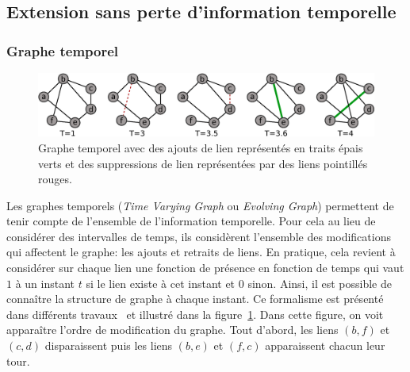 
\subsection{Extension sans perte d'information temporelle}
\label{subsec:pasperte_info}
\subsubsection{Graphe temporel}
\begin{figure}[h]
\centering
\includegraphics[width=0.9\linewidth]{img/Intro/evolvingGraph.eps}
\caption{Graphe temporel avec des ajouts de lien représentés en traits épais verts et des suppressions de lien représentées par des liens pointillés rouges.
}
\label{fig:exemple_evolving}
\end{figure}
Les graphes temporels (\emph{Time Varying Graph} ou \emph{Evolving Graph})
permettent de tenir compte de l'ensemble de l'information temporelle.
Pour cela au lieu de considérer des intervalles de temps, ils considèrent l'ensemble des modifications qui affectent le graphe: les ajouts et retraits de liens.
En pratique, cela revient à considérer sur chaque lien une fonction de présence en fonction de temps qui vaut $1$ à un instant $t$ si le lien existe à cet instant et $0$ sinon.
Ainsi, il est possible de connaître la structure de graphe à chaque instant.
Ce formalisme est présenté dans différents travaux~\cite{Casteigts2011,Wehmuth2015} et illustré dans la figure~\ref{fig:exemple_evolving}.
Dans cette figure, on voit apparaître l'ordre de modification du graphe.
Tout d'abord, les liens $(b,f)$ et $(c,d)$ disparaissent puis les liens $(b,e)$ et $(f,c)$ apparaissent chacun leur tour. 

